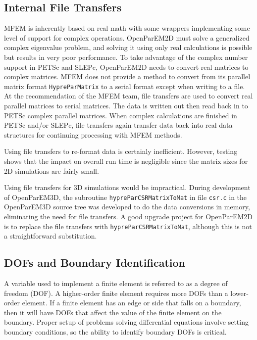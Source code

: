\documentclass[titlepage]{article}
\renewcommand\_{\textunderscore\linebreak[1]}
\begin{document}
\subsection{Internal File Transfers}

MFEM is inherently based on real math with some wrappers implementing some level of support for complex operations.  OpenParEM2D must solve a generalized complex eigenvalue problem, and solving it using only real calculations is possible but results in very poor performance.  To take advantage of the complex number support in PETSc and SLEPc, OpenParEM2D needs to convert real matrices to complex matrices.  MFEM does not provide a method to convert from its parallel matrix format \texttt{HypreParMatrix} to a serial format except when writing to a file.  At the recommendation of the MFEM team, file transfers are used to convert real parallel matrices to serial matrices.  The data is written out then read back in to PETSc complex parallel matrices.  When complex calculations are finished in PETSc and/or SLEPc, file transfers again transfer data back into real data structures for continuing processing with MFEM methods.

Using file transfers to re-format data is certainly inefficient.  However, testing shows that the impact on overall run time is negligible since the matrix sizes for 2D simulations are fairly small.

Using file transfers for 3D simulations would be impractical.  During development of OpenParEM3D, the subroutine \texttt{hypre\_ParCSRMatrixToMat} in file \texttt{csr.c} in the OpenParEM3D source tree was developed to do the data conversions in memory, eliminating the need for file transfers.  A good upgrade project for OpenParEM2D is to replace the file transfers with \texttt{hypre\_ParCSRMatrixToMat}, although this is not a straightforward substitution.

\subsection{DOFs and Boundary Identification}

A variable used to implement a finite element is referred to as a degree of freedom (DOF).  A higher-order finite element requires more DOFs than a lower-order element.  If a finite element has an edge or side that falls on a boundary, then it will have DOFs that affect the value of the finite element on the boundary.  Proper setup of problems solving differential equations involve setting boundary conditions, so the ability to identify boundary DOFs is critical.
\end{document}
